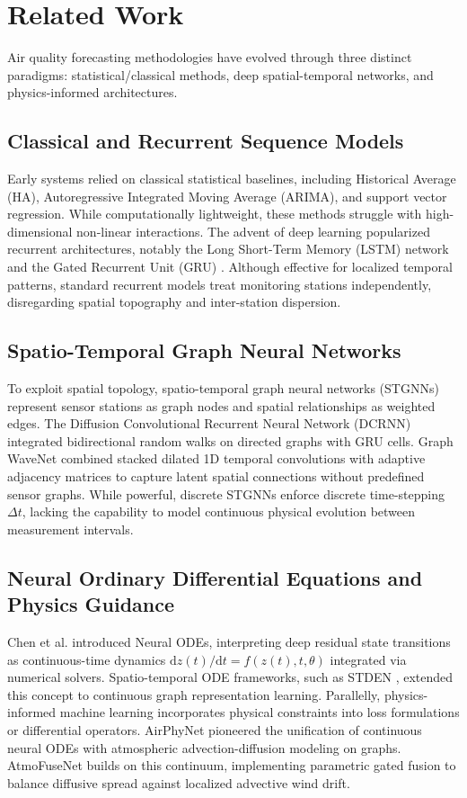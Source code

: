 \documentclass[conference]{IEEEtran}
\begin{document}
\section{Related Work}
Air quality forecasting methodologies have evolved through three distinct paradigms: statistical/classical methods, deep spatial-temporal networks, and physics-informed architectures.

\subsection{Classical and Recurrent Sequence Models}
Early systems relied on classical statistical baselines, including Historical Average (HA), Autoregressive Integrated Moving Average (ARIMA), and support vector regression. While computationally lightweight, these methods struggle with high-dimensional non-linear interactions. The advent of deep learning popularized recurrent architectures, notably the Long Short-Term Memory (LSTM) \cite{hochreiter1997lstm} network and the Gated Recurrent Unit (GRU) \cite{cho2014gru}. Although effective for localized temporal patterns, standard recurrent models treat monitoring stations independently, disregarding spatial topography and inter-station dispersion.

\subsection{Spatio-Temporal Graph Neural Networks}
To exploit spatial topology, spatio-temporal graph neural networks (STGNNs) represent sensor stations as graph nodes and spatial relationships as weighted edges. The Diffusion Convolutional Recurrent Neural Network (DCRNN) \cite{li2018dcrnn} integrated bidirectional random walks on directed graphs with GRU cells. Graph WaveNet \cite{wu2019graphwavenet} combined stacked dilated 1D temporal convolutions with adaptive adjacency matrices to capture latent spatial connections without predefined sensor graphs. While powerful, discrete STGNNs enforce discrete time-stepping $\Delta t$, lacking the capability to model continuous physical evolution between measurement intervals.

\subsection{Neural Ordinary Differential Equations and Physics Guidance}
Chen et al. \cite{chen2018neuralode} introduced Neural ODEs, interpreting deep residual state transitions as continuous-time dynamics $\mathrm{d}z(t)/\mathrm{d}t = f(z(t), t, \theta)$ integrated via numerical solvers. Spatio-temporal ODE frameworks, such as STDEN \cite{ji2022stden}, extended this concept to continuous graph representation learning. Parallelly, physics-informed machine learning \cite{karniadakis2021pinn} incorporates physical constraints into loss formulations or differential operators. AirPhyNet \cite{hettige2024airphynet} pioneered the unification of continuous neural ODEs with atmospheric advection-diffusion modeling on graphs. AtmoFuseNet builds on this continuum, implementing parametric gated fusion to balance diffusive spread against localized advective wind drift.
\end{document}
